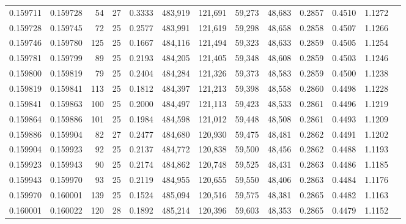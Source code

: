\begin{tabular}{rrrrrrrrrrrrr}
0.159711 & 0.159728 &    54 &  27 &                                     0.3333 & 483,919 & 121,691 &  59,273 &  48,683 & 0.2857 & 0.4510 & 1.1272 \\
0.159728 & 0.159745 &    72 &  25 &                                     0.2577 & 483,991 & 121,619 &  59,298 &  48,658 & 0.2858 & 0.4507 & 1.1266 \\
0.159746 & 0.159780 &   125 &  25 &                                     0.1667 & 484,116 & 121,494 &  59,323 &  48,633 & 0.2859 & 0.4505 & 1.1254 \\
0.159781 & 0.159799 &    89 &  25 &                                     0.2193 & 484,205 & 121,405 &  59,348 &  48,608 & 0.2859 & 0.4503 & 1.1246 \\
0.159800 & 0.159819 &    79 &  25 &                                     0.2404 & 484,284 & 121,326 &  59,373 &  48,583 & 0.2859 & 0.4500 & 1.1238 \\
0.159819 & 0.159841 &   113 &  25 &                                     0.1812 & 484,397 & 121,213 &  59,398 &  48,558 & 0.2860 & 0.4498 & 1.1228 \\
0.159841 & 0.159863 &   100 &  25 &                                     0.2000 & 484,497 & 121,113 &  59,423 &  48,533 & 0.2861 & 0.4496 & 1.1219 \\
0.159864 & 0.159886 &   101 &  25 &                                     0.1984 & 484,598 & 121,012 &  59,448 &  48,508 & 0.2861 & 0.4493 & 1.1209 \\
0.159886 & 0.159904 &    82 &  27 &                                     0.2477 & 484,680 & 120,930 &  59,475 &  48,481 & 0.2862 & 0.4491 & 1.1202 \\
0.159904 & 0.159923 &    92 &  25 &                                     0.2137 & 484,772 & 120,838 &  59,500 &  48,456 & 0.2862 & 0.4488 & 1.1193 \\
0.159923 & 0.159943 &    90 &  25 &                                     0.2174 & 484,862 & 120,748 &  59,525 &  48,431 & 0.2863 & 0.4486 & 1.1185 \\
0.159943 & 0.159970 &    93 &  25 &                                     0.2119 & 484,955 & 120,655 &  59,550 &  48,406 & 0.2863 & 0.4484 & 1.1176 \\
0.159970 & 0.160001 &   139 &  25 &                                     0.1524 & 485,094 & 120,516 &  59,575 &  48,381 & 0.2865 & 0.4482 & 1.1163 \\
0.160001 & 0.160022 &   120 &  28 &                                     0.1892 & 485,214 & 120,396 &  59,603 &  48,353 & 0.2865 & 0.4479 & 1.1152 \\

\end{tabular}
